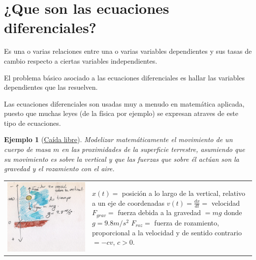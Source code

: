 \documentclass{article}
\newtheorem{ejemplo}{Ejemplo}}
\begin{document}
\section{¿Que son las ecuaciones diferenciales?}


\begin{definicion}
 Es una o varias relaciones entre una o varias variables dependientes y sus tasas de cambio respecto a ciertas variables independientes.
 \end{definicion}

 El problema básico asociado
 a las ecuaciones diferenciales es hallar las variables dependientes que las resuelven.

 Las ecuaciones diferenciales son usadas muy a menudo en matemática aplicada, puesto que muchas
 leyes (de la física por ejemplo) se expresan atraves de este tipo de ecuaciones.








 \begin{ejemplo}[\href{http://es.wikipedia.org/wiki/Caída_libre}{Caída libre}] Modelizar matemáticamente el movimiento de un cuerpo de masa $m$ en las proximidades de la superficie
terrestre, asumiendo que su movimiento es
sobre la vertical y que las fuerzas que sobre él actúan son la gravedad y el rozamiento con el aire.
\end{ejemplo}
 \begin{tabular}{m{4.5cm} m{5cm}} \includegraphics[scale=0.07]{imagenes/caida_libre.jpg}    &  $x(t)=$ posición a lo largo de la vertical, relativo a un eje de coordenadas\newline
$v(t)=\frac{dx}{dt}=$ velocidad\newline
$F_{grav}=$ fuerza debida a la gravedad $=mg$ donde $g=9.8m/s^2$
$F_{roz}=$ fuerza de rozamiento, proporcional a la velocidad y de sentido contrario $=-cv$, $c>0$.

\end{tabular} 
\end{document}
